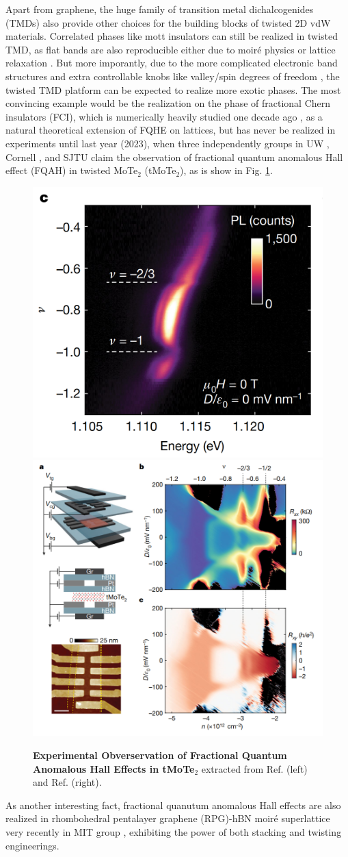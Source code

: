 Apart from graphene, the huge family of transition metal dichalcogenides (TMDs) also provide other choices for the building blocks of twisted 2D vdW materials. Correlated phases like mott insulators can still be realized \cite{zhang2020flat,wang2020correlated} in twisted TMD, as flat bands are also reproducible either due to moir\'e physics or lattice relaxation \cite{devakul2021magic,li2021lattice}. But more imporantly,  due to the more complicated electronic band structures \cite{manzeli20172d} and extra controllable knobs like valley/spin degrees of freedom \cite{xiao2012coupled}, the twisted TMD platform can be expected to realize more exotic phases. The most convincing example would be the realization on the phase of fractional Chern insulators (FCI), which is numerically heavily studied one decade ago \cite{neupert2011fractional,tang2011high,sheng2011fractional,regnault2011fractional}, as a natural theoretical extension of FQHE on lattices, but has never be realized in experiments until last year (2023), when three independently groups in UW \cite{cai2023signatures,park2023observation}, Cornell \cite{zeng2023thermodynamic}, and SJTU \cite{xu2023observation} claim the observation of fractional quantum anomalous Hall effect (FQAH) in twisted MoTe$_2$ (tMoTe$_2$), as is show in Fig. \ref{fig:tMoTe2_UW}.
\begin{figure}[!htp]
    \centering
    \includegraphics[height=0.4\textwidth]{figures/Introduction/tMoTe2_PL.png}
    \hspace{1em}
    \includegraphics[height=0.4\textwidth]{figures/Introduction/tMoTe2_transport.png}
    \caption{\textbf{Experimental Obverservation of Fractional Quantum Anomalous Hall Effects in tMoTe$_2$} extracted from Ref. \cite{cai2023signatures} (left) and Ref. \cite{park2023observation} (right).}
    \label{fig:tMoTe2_UW}
\end{figure}
As another interesting fact, fractional quanutum anomalous Hall effects are also realized in rhombohedral pentalayer graphene (RPG)-hBN moir\'e superlattice very recently in MIT group \cite{lu2024fractional}, exhibiting the power of both stacking and twisting engineerings.



